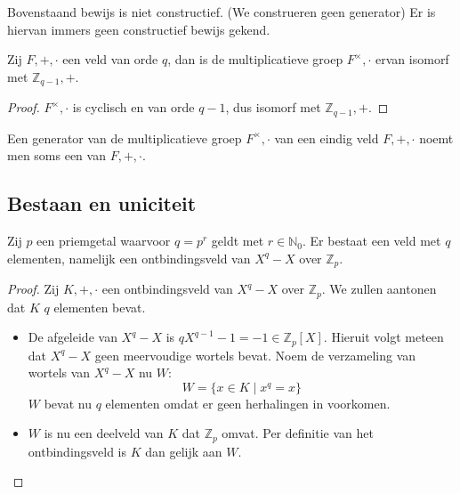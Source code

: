 \documentclass[main.tex]{subfiles}
\begin{document}
\begin{opm}
  Bovenstaand bewijs is niet constructief.
  (We construeren geen generator)
  Er is hiervan immers geen constructief bewijs gekend.
\end{opm}

\begin{gev}
  Zij $F,+,\cdot$ een veld van orde $q$, dan is de multiplicatieve groep $F^{\times},\cdot$ ervan isomorf met $\mathbb{Z}_{q-1},+$.

  \begin{proof}
    $F^{\times},\cdot$ is cyclisch en van orde $q-1$, dus isomorf met $\mathbb{Z}_{q-1},+$. \needed
  \end{proof}
\end{gev}

\begin{de}
  Een generator van de multiplicatieve groep $F^{\times},\cdot$ van een eindig veld $F,+,\cdot$ noemt men soms een  van $F,+,\cdot$.
\end{de}

\subsection{Bestaan en uniciteit}
\label{sec:bestaan-en-uniciteit}

\begin{st}
  \examen
  \label{st:priemveld-bestaat}
  Zij $p$ een priemgetal waarvoor $q=p^{r}$ geldt met $r\in \mathbb{N}_{0}$.
  Er bestaat een veld met $q$ elementen, namelijk een ontbindingsveld van $X^{q}-X$ over $\mathbb{Z}_{p}$.

  \begin{proof}
    Zij $K,+,\cdot$ een ontbindingsveld van $X^{q}-X$ over $\mathbb{Z}_{p}$.
    We zullen aantonen dat $K$ $q$ elementen bevat.
    \begin{itemize}
    \item De afgeleide van $X^{q}-X$ is $qX^{q-1}-1 = -1\in \mathbb{Z}_{p}[X]$.
      Hieruit volgt meteen dat $X^{q}-X$ geen meervoudige wortels bevat.
      Noem de verzameling van wortels van $X^{q}-X$ nu $W$:
      \[ W = \{ x\in K \mid x^{q} = x\} \]
      $W$ bevat nu $q$ elementen omdat er geen herhalingen in voorkomen.
    \item $W$ is nu een deelveld van $K$ dat $\mathbb{Z}_{p}$ omvat. \waarom
      Per definitie van het ontbindingsveld is $K$ dan gelijk aan $W$.
    \end{itemize}
  \end{proof}
\end{st}
\end{document}
